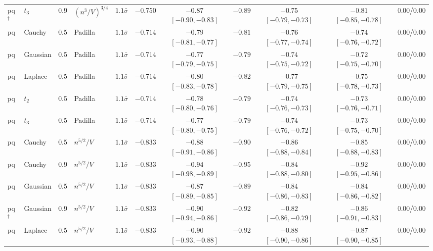 \begin{longtable}{lllllcccccc}
pq$^\dagger$ & $t_3$ & 0.9 & $(n^3/V)^{3/4}$ & $1.1\bar\sigma$ & $-0.750$ & $-0.87$ {\scriptsize $[-0.90, -0.83]$} & $-0.89$ & $-0.75$ {\scriptsize $[-0.79, -0.73]$} & $-0.81$ {\scriptsize $[-0.85, -0.78]$} & 0.00/0.00 \\
pq & Cauchy & 0.5 & Padilla & $1.1\bar\sigma$ & $-0.714$ & $-0.79$ {\scriptsize $[-0.81, -0.77]$} & $-0.81$ & $-0.76$ {\scriptsize $[-0.77, -0.74]$} & $-0.74$ {\scriptsize $[-0.76, -0.72]$} & 0.00/0.00 \\
pq & Gaussian & 0.5 & Padilla & $1.1\bar\sigma$ & $-0.714$ & $-0.77$ {\scriptsize $[-0.79, -0.75]$} & $-0.79$ & $-0.74$ {\scriptsize $[-0.75, -0.72]$} & $-0.72$ {\scriptsize $[-0.75, -0.70]$} & 0.00/0.00 \\
pq & Laplace & 0.5 & Padilla & $1.1\bar\sigma$ & $-0.714$ & $-0.80$ {\scriptsize $[-0.83, -0.78]$} & $-0.82$ & $-0.77$ {\scriptsize $[-0.79, -0.75]$} & $-0.75$ {\scriptsize $[-0.78, -0.73]$} & 0.00/0.00 \\
pq & $t_2$ & 0.5 & Padilla & $1.1\bar\sigma$ & $-0.714$ & $-0.78$ {\scriptsize $[-0.80, -0.76]$} & $-0.79$ & $-0.74$ {\scriptsize $[-0.76, -0.73]$} & $-0.73$ {\scriptsize $[-0.76, -0.71]$} & 0.00/0.00 \\
pq & $t_3$ & 0.5 & Padilla & $1.1\bar\sigma$ & $-0.714$ & $-0.77$ {\scriptsize $[-0.80, -0.75]$} & $-0.79$ & $-0.74$ {\scriptsize $[-0.76, -0.72]$} & $-0.73$ {\scriptsize $[-0.75, -0.70]$} & 0.00/0.00 \\
pq & Cauchy & 0.5 & $n^{5/2}/V$ & $1.1\bar\sigma$ & $-0.833$ & $-0.88$ {\scriptsize $[-0.91, -0.86]$} & $-0.90$ & $-0.86$ {\scriptsize $[-0.88, -0.84]$} & $-0.85$ {\scriptsize $[-0.88, -0.83]$} & 0.00/0.00 \\
pq & Cauchy & 0.9 & $n^{5/2}/V$ & $1.1\bar\sigma$ & $-0.833$ & $-0.94$ {\scriptsize $[-0.98, -0.89]$} & $-0.95$ & $-0.84$ {\scriptsize $[-0.88, -0.80]$} & $-0.92$ {\scriptsize $[-0.95, -0.86]$} & 0.00/0.00 \\
pq & Gaussian & 0.5 & $n^{5/2}/V$ & $1.1\bar\sigma$ & $-0.833$ & $-0.87$ {\scriptsize $[-0.89, -0.85]$} & $-0.89$ & $-0.84$ {\scriptsize $[-0.86, -0.83]$} & $-0.84$ {\scriptsize $[-0.86, -0.82]$} & 0.00/0.00 \\
pq$^\dagger$ & Gaussian & 0.9 & $n^{5/2}/V$ & $1.1\bar\sigma$ & $-0.833$ & $-0.90$ {\scriptsize $[-0.94, -0.86]$} & $-0.92$ & $-0.82$ {\scriptsize $[-0.86, -0.79]$} & $-0.86$ {\scriptsize $[-0.91, -0.83]$} & 0.00/0.00 \\
pq & Laplace & 0.5 & $n^{5/2}/V$ & $1.1\bar\sigma$ & $-0.833$ & $-0.90$ {\scriptsize $[-0.93, -0.88]$} & $-0.92$ & $-0.88$ {\scriptsize $[-0.90, -0.86]$} & $-0.87$ {\scriptsize $[-0.90, -0.85]$} & 0.00/0.00 \\

\end{longtable}
